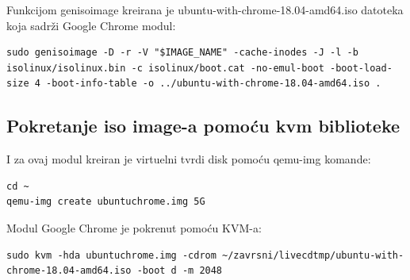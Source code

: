 \documentclass[12pt,vi]{mitthesis}
\begin{document}
\noindent
Funkcijom genisoimage kreirana je ubuntu-with-chrome-18.04-amd64.iso datoteka koja sadrži Google Chrome modul:
\begin{lstlisting}[style=BashInputStyle]
sudo genisoimage -D -r -V "$IMAGE_NAME" -cache-inodes -J -l -b isolinux/isolinux.bin -c isolinux/boot.cat -no-emul-boot -boot-load-size 4 -boot-info-table -o ../ubuntu-with-chrome-18.04-amd64.iso .
\end{lstlisting}

\subsection*{Pokretanje iso image-a pomoću kvm biblioteke}
\indent
I za ovaj modul kreiran je virtuelni tvrdi disk pomoću qemu-img komande:
\begin{lstlisting}[style=BashInputStyle]
cd ~
qemu-img create ubuntuchrome.img 5G
\end{lstlisting}

\noindent 
Modul Google Chrome je pokrenut pomoću KVM-a:
\begin{lstlisting}[style=BashInputStyle]
sudo kvm -hda ubuntuchrome.img -cdrom ~/zavrsni/livecdtmp/ubuntu-with-chrome-18.04-amd64.iso -boot d -m 2048
\end{lstlisting}
\end{document}
